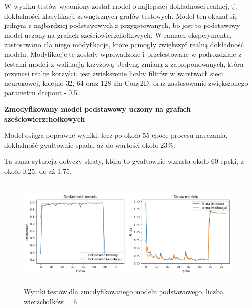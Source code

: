 W wyniku testów wyłoniony został model o najlepszej dokładności realnej, tj.
dokładności klasyfikacji zewnętrznych grafów testowych.
Model ten okazał się jednym z najbardziej podstawowych z przygotowanych,
bo jest to podstawowy model uczony na grafach sześciowierzchołkowych.
W ramach eksperymentu, zastosowano dla niego modyfikacje,
które pomogły zwiększyć realną dokładność modelu.
Modyfikacje te zostały wprowadzone i przetestowane w podrozdziale z testami modeli
z walidacją krzyżową.
Jedyną zmianą z zaproponowanych, która przynosi realne korzyści,
jest zwiększenie liczby filtrów w warstwach sieci neuronowej, kolejno 32, 64 oraz 128 dla Conv2D,
oraz zastosowanie zwiększonego parametru dropout - 0,5.

\textbf{Zmodyfikowany model podstawowy uczony na grafach sześciowierzchołkowych}

Model osiąga poprawne wyniki, lecz po około 55 epoce procesu nauczania,
dokładność gwałtownie spada, aż do wartości około 23\%.

Ta sama sytuacja dotyczy straty, która to gwałtownie wzrasta około 60 epoki,
z około 0,25, do aż 1,75.

\begin{figure}[ht]
	\centering
	\includegraphics[height=5.5cm]{resources/tests/images/v4/base6_1_img.png}
	\caption{Wyniki testów dla zmodyfikowanego modelu podstawowego, liczba wierzchołków = 6}
	\label{Fig:tests-base-5a}
\end{figure}
\FloatBarrier



